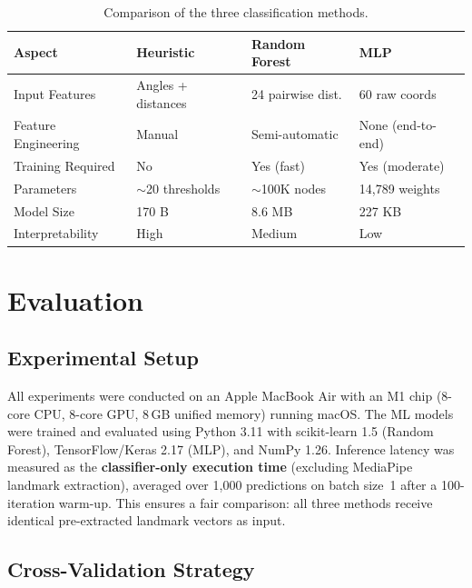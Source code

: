 \documentclass[11pt,a4paper]{article}
\begin{document}
\begin{table}[H]
\centering
\caption{Comparison of the three classification methods.}
\label{tab:method-comparison}
\begin{tabular}{@{}llll@{}}
\toprule
\textbf{Aspect} & \textbf{Heuristic} & \textbf{Random Forest} & \textbf{MLP} \\
\midrule
Input Features & Angles + distances & 24 pairwise dist. & 60 raw coords \\
Feature Engineering & Manual & Semi-automatic & None (end-to-end) \\
Training Required & No & Yes (fast) & Yes (moderate) \\
Parameters & $\sim$20 thresholds & $\sim$100K nodes & 14,789 weights \\
Model Size & 170 B & 8.6 MB & 227 KB \\
Interpretability & High & Medium & Low \\
\bottomrule
\end{tabular}
\end{table}

\section{Evaluation}
\label{sec:evaluation}

\subsection{Experimental Setup}

All experiments were conducted on an Apple MacBook Air with an M1 chip (8-core CPU, 8-core GPU, 8\,GB unified memory) running macOS. The ML models were trained and evaluated using Python 3.11 with scikit-learn 1.5 (Random Forest), TensorFlow/Keras 2.17 (MLP), and NumPy 1.26. Inference latency was measured as the \textbf{classifier-only execution time} (excluding MediaPipe landmark extraction), averaged over 1,000 predictions on batch size~1 after a 100-iteration warm-up. This ensures a fair comparison: all three methods receive identical pre-extracted landmark vectors as input.

\subsection{Cross-Validation Strategy}
\end{document}
